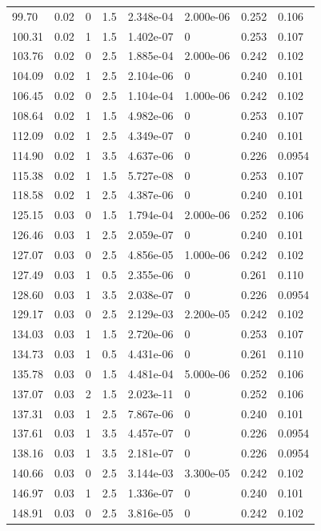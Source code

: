 \documentclass[preview]{standalone}
\begin{document}
{{{\begin{tabular}{L{1.2cm}C{1.2cm} C{0.3cm}C{0.5cm} C{1.4cm}C{1.4cm} C{1.4cm}C{1.4cm}}
  99.70  &  0.02  & 0     & 1.5 &  2.348e-04  & 2.000e-06  & 0.252 &  0.106   \\ 
  100.31  &  0.02  & 1     & 1.5 &  1.402e-07  & 0  & 0.253 &  0.107   \\ 
  103.76  &  0.02  & 0     & 2.5 &  1.885e-04  & 2.000e-06  & 0.242 &  0.102   \\ 
  104.09  &  0.02  & 1     & 2.5 &  2.104e-06  & 0  & 0.240 &  0.101   \\ 
  106.45  &  0.02  & 0     & 2.5 &  1.104e-04  & 1.000e-06  & 0.242 &  0.102   \\ 
  108.64  &  0.02  & 1     & 1.5 &  4.982e-06  & 0  & 0.253 &  0.107   \\ 
  112.09  &  0.02  & 1     & 2.5 &  4.349e-07  & 0  & 0.240 &  0.101   \\ 
  114.90  &  0.02  & 1     & 3.5 &  4.637e-06  & 0  & 0.226 &  0.0954   \\ 
  115.38  &  0.02  & 1     & 1.5 &  5.727e-08  & 0  & 0.253 &  0.107   \\ 
  118.58  &  0.02  & 1     & 2.5 &  4.387e-06  & 0  & 0.240 &  0.101   \\ 
  125.15  &  0.03  & 0     & 1.5 &  1.794e-04  & 2.000e-06  & 0.252 &  0.106   \\ 
  126.46  &  0.03  & 1     & 2.5 &  2.059e-07  & 0  & 0.240 &  0.101   \\ 
  127.07  &  0.03  & 0     & 2.5 &  4.856e-05  & 1.000e-06  & 0.242 &  0.102   \\ 
  127.49  &  0.03  & 1     & 0.5 &  2.355e-06  & 0  & 0.261 &  0.110   \\ 
  128.60  &  0.03  & 1     & 3.5 &  2.038e-07  & 0  & 0.226 &  0.0954   \\ 
  129.17  &  0.03  & 0     & 2.5 &  2.129e-03  & 2.200e-05  & 0.242 &  0.102   \\ 
  134.03  &  0.03  & 1     & 1.5 &  2.720e-06  & 0  & 0.253 &  0.107   \\ 
  134.73  &  0.03  & 1     & 0.5 &  4.431e-06  & 0  & 0.261 &  0.110   \\ 
  135.78  &  0.03  & 0     & 1.5 &  4.481e-04  & 5.000e-06  & 0.252 &  0.106   \\ 
  137.07  &  0.03  & 2     & 1.5 &  2.023e-11  & 0  & 0.252 &  0.106   \\ 
  137.31  &  0.03  & 1     & 2.5 &  7.867e-06  & 0  & 0.240 &  0.101   \\ 
  137.61  &  0.03  & 1     & 3.5 &  4.457e-07  & 0  & 0.226 &  0.0954   \\ 
  138.16  &  0.03  & 1     & 3.5 &  2.181e-07  & 0  & 0.226 &  0.0954   \\ 
  140.66  &  0.03  & 0     & 2.5 &  3.144e-03  & 3.300e-05  & 0.242 &  0.102   \\ 
  146.97  &  0.03  & 1     & 2.5 &  1.336e-07  & 0  & 0.240 &  0.101   \\ 
  148.91  &  0.03  & 0     & 2.5 &  3.816e-05  & 0  & 0.242 &  0.102   \\ 
\hline 
\end{tabular} 

}}}
\end{document}
